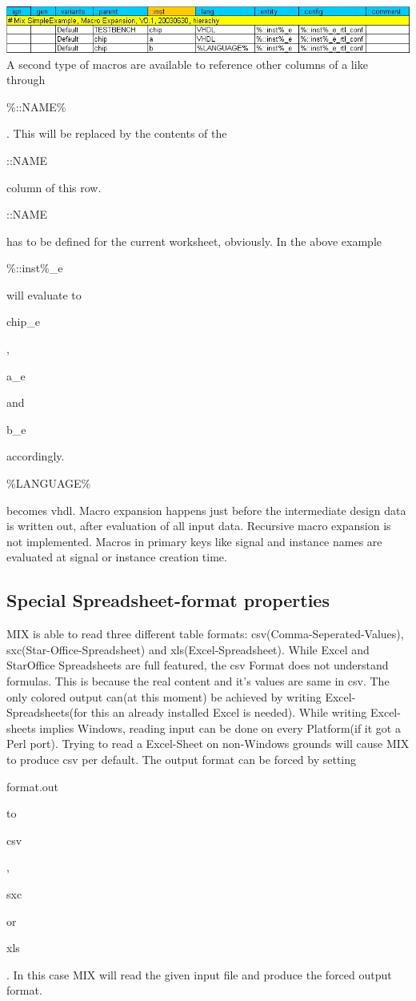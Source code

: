 \documentclass[a4paper,12pt]{article}
\begin{document}
\includegraphics[scale=0.6]{images/mix_table0.jpg}\\
A second type of macros are available to reference other columns of a like through \begin{tt}\%::NAME\%\end{tt}. This will be replaced by the contents of the \begin{tt}::NAME\end{tt} column of this row. \begin{tt}::NAME\end{tt} has to be defined for the current worksheet, obviously. In the above example \begin{tt}\%::inst\%\_e\end{tt} will evaluate to \begin{tt}chip\_e\end{tt}, \begin{tt}a\_e\end{tt} and \begin{tt}b\_e\end{tt} accordingly. \begin{tt}\%LANGUAGE\%\end{tt} becomes vhdl. Macro expansion happens just before the intermediate design data is written out, after evaluation of all input data. Recursive macro expansion is not implemented. Macros in primary keys like signal and instance names are evaluated at signal or instance creation time.

\subsection{Special Spreadsheet-format properties}
MIX is able to read three different table formats: csv(Comma-Seperated-Values), sxc(Star-Office-Spreadsheet) and xls(Excel-Spreadsheet). While Excel and StarOffice Spreadsheets are full featured, the csv Format does not understand formulas. This is because the real content and it's values are same in csv. The only colored output can(at this moment) be achieved by writing Excel-Spreadsheets(for this an already installed Excel is needed). While writing Excel-sheets implies Windows, reading input can be done on every Platform(if it got a Perl port). Trying to read a Excel-Sheet on non-Windows grounds will cause MIX to produce csv per default. The output format can be forced by setting \begin{tt}format.out\end{tt} to \begin{tt}csv\end{tt}, \begin{tt}sxc\end{tt} or \begin{tt}xls\end{tt}. In this case MIX will read the given input file and produce the forced output format.
\end{document}
